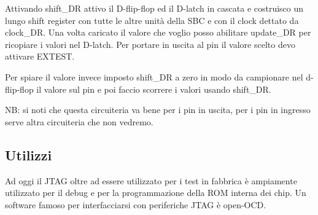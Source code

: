 Attivando shift\_DR attivo il D-flip-flop ed il D-latch in cascata e costruisco un lungo shift register con tutte le altre unità della SBC e con il clock dettato da clock\_DR.
Una volta caricato il valore che voglio posso abilitare update\_DR per ricopiare i valori nel D-latch.
Per portare in uscita al pin il valore scelto devo attivare EXTEST.

Per spiare il valore invece imposto shift\_DR a zero in modo da campionare nel d-flip-flop il valore sul pin e poi faccio scorrere i valori usando shift\_DR.

NB: si noti che questa circuiteria va bene per i pin in uscita, per i pin in ingresso serve altra circuiteria che non vedremo.

\subsection{Utilizzi}
Ad oggi il JTAG oltre ad essere utilizzato per i test in fabbrica è ampiamente utilizzato per il debug e per la programmazione della ROM interna dei chip.
Un software famoso per interfacciarsi con periferiche JTAG è open-OCD.








